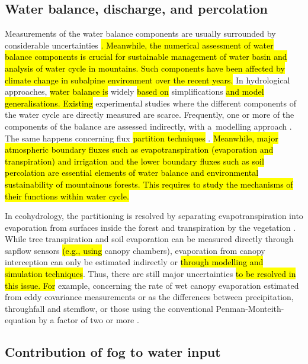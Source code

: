 \documentclass[10pt,letterpaper]{article}
\begin{document}
\subsection{Water balance, discharge, and percolation}

Measurements of the water balance components are usually surrounded by considerable uncertainties \cite{e16b77c7c83b4b92b69d38a25a041d1a}\hl{. Meanwhile, the numerical assessment of water balance components is crucial for sustainable management of water basin and analysis of water cycle in mountains. Such components have been affected by climate change in subalpine environment over the recent years.} In hydrological approaches, \hl{water balance is }widely \hl{based on} simplifications \hl{and model generalisations. Existing} experimental studies where the different components of the water cycle are directly measured are scarce. Frequently, one or more of the components of the balance are assessed indirectly, with a modelling approach \cite{CERMAK199517}. The same happens concerning flux \hl{partition techniques} \cite{Nelsonetal2020}. \hl{Meanwhile, major atmospheric boundary fluxes such as evapotranspiration (evaporation and transpiration) and irrigation and the lower boundary fluxes such as soil percolation are essential elements of water balance and environmental sustainability of mountainous forests. This requires to study the mechanisms of their functions within water cycle. }

In ecohydrology, the partitioning is resolved by separating evapotranspiration into evaporation from surfaces inside the forest and transpiration by the vegetation \cite{Mastrotheodoros,Savenije}. While tree transpiration and soil evaporation can be measured directly through sapflow sensors \hl{(e.g., using} canopy chambers), evaporation from canopy interception can\hl{ }only be estimated indirectly or \hl{through modelling and simulation techniques}. Thus, there are still major uncertainties \hl{to be resolved in this issue. For} example, concerning the rate of wet canopy evaporation estimated from eddy covariance measurements or as the differences between precipitation, throughfall and stemflow, or those using the conventional Penman-Monteith-equation by a factor of two or more \cite{VANDIJK2015402,HOLWERDA2006592}. 

\subsection{Contribution of fog to water input}
\end{document}

